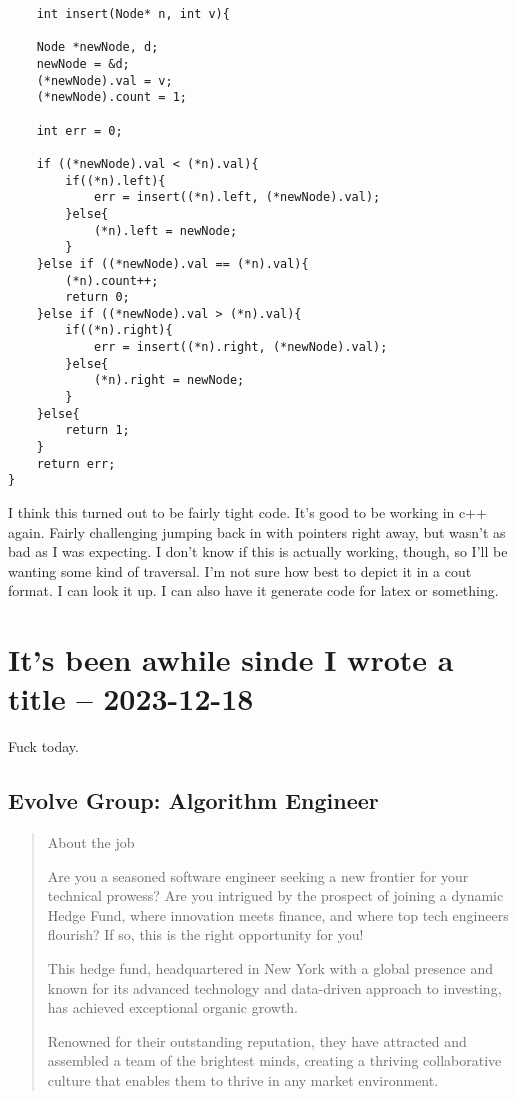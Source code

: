 \documentclass[
	letterpaper, %
	12pt, %
]{CSSullivanBusinessReport}
\begin{document}
\begin{verbatim}
	int insert(Node* n, int v){

    Node *newNode, d;
    newNode = &d;
    (*newNode).val = v;
    (*newNode).count = 1;

    int err = 0;

    if ((*newNode).val < (*n).val){
        if((*n).left){
            err = insert((*n).left, (*newNode).val);
        }else{
            (*n).left = newNode;
        }
    }else if ((*newNode).val == (*n).val){
        (*n).count++;
        return 0;
    }else if ((*newNode).val > (*n).val){
        if((*n).right){
            err = insert((*n).right, (*newNode).val);
        }else{
            (*n).right = newNode;
        }
    }else{
        return 1;
    }
    return err;
}
\end{verbatim}

I think this turned out to be fairly tight code. It's good to be working in c++ again. Fairly challenging jumping back in with pointers right away, but wasn't as bad as I was expecting. I don't know if this is actually working, though, so I'll be wanting some kind of traversal. I'm not sure how best to depict it in a cout format. I can look it up. I can also have it generate code for latex or something. 


\section[18 Dec: Oops]{It's been awhile sinde I wrote a title -- 2023-12-18} %

Fuck today.


\subsection[Evolve Group]{Evolve Group: Algorithm Engineer}

\begin{quote}
	About the job
	
	Are you a seasoned software engineer seeking a new frontier for your technical prowess? Are you intrigued by the prospect of joining a dynamic Hedge Fund, where innovation meets finance, and where top tech engineers flourish? If so, this is the right opportunity for you!

	This hedge fund, headquartered in New York with a global presence and known for its advanced technology and data-driven approach to investing, has achieved exceptional organic growth.
	
	Renowned for their outstanding reputation, they have attracted and assembled a team of the brightest minds, creating a thriving collaborative culture that enables them to thrive in any market environment.

\end{quote}
\end{document}
